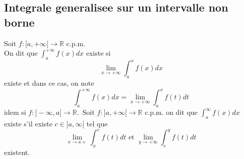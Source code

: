 \documentclass[../main.tex]{subfiles}
\begin{document}
\subsection{Integrale generalisee sur un intervalle non borne}
\begin{defn}\label{defn:Integrale sur un intervalle non borneintegrale_sur_un_intervalle_non_borne}
	Soit $f: [ a, + \infty [  \to \mathbb{R} $ c.p.m.\\
	On dit que $ \int_{ a }^{ + \infty  } f( x) dx$ existe si
	\[ 
		\lim_{x \to  + \infty} \int_{ a }^{ x }f( x) dx
	\]
	existe et dans ce cas, on note
	\[ 
		\int_{ a }^{ + \infty  }f( x) dx = \lim_{x \to  + \infty} \int_{ a }^{ x }f( t) dt
	\]
	idem si $f: ]- \infty , a[ \to \mathbb{R}$.\
	Soit $f:]a,+ \infty [ \to \mathbb{R} $ c.p.m. on dit que $\int_{ a }^{ \infty  }f( x) dx$ existe s'il existe $c\in ]a, \infty [ $ tel que 
	\[ 
		\lim_{x \to a+}  \int_{ x }^{ c }f( t) dt \text{ et   } \lim_{y \to  + \infty} \int_{ c }^{ y }f( t) dt
	\]
	existent.
\end{defn}
\end{document}
